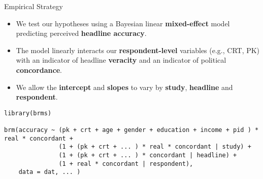 \documentclass[10pt,table]{beamer}
\begin{document}





\begin{frame}[t, fragile, label = empirics]{Empirical Strategy}

\setlength{\leftmargini}{5pt}
\setlength{\leftmarginii}{8pt}
\setlength{\leftmarginiii}{8pt}
\setlength{\rightmargini}{10pt}
\small


\setlength{\leftmargini}{15pt}
\setlength{\rightmargini}{30pt}
\vspace{0.5em} \small

\begin{itemize}
    \item We test our hypotheses using a Bayesian linear \alert{\textbf{mixed-effect}} model \\ predicting perceived \alert{\bf headline accuracy}. \medskip \pause 
    \item The model linearly interacts our \alert{\bf respondent-level} variables (e.g., CRT, PK) \\ with an indicator of headline \alert{\bf veracity} and an indicator of political \\ \alert{\bf concordance}. \medskip \pause
    \item We allow the \alert{\bf intercept} and \alert{\bf slopes} to vary by \alert{\bf study}, \alert{\bf headline} and \alert{\bf respondent}.
\end{itemize}
\medskip
\pause
\begin{verbatim}
library(brms)

brm(accuracy ~ (pk + crt + age + gender + education + income + pid ) * real * concordant + 
               (1 + (pk + crt + ... ) * real * concordant | study) + 
               (1 + (pk + crt + ... ) * concordant | headline) + 
               (1 + real * concordant | respondent), 
    data = dat, ... )
\end{verbatim}




\end{frame}
\end{document}
